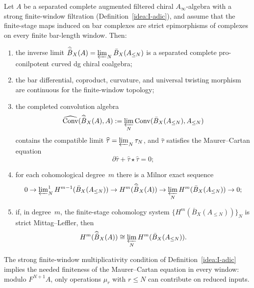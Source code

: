 \begin{theorem}\label{thm:completion-convergence}
Let $A$ be a separated complete augmented filtered chiral
$A_\infty$-algebra with a strong finite-window filtration
\textup{(}Definition~\textup{\ref{idea:I-adic}}\textup{)}, and assume
that the finite-stage maps induced on bar complexes are strict
epimorphisms of complexes on every finite bar-length window.  Then:
\begin{enumerate}
\item the inverse limit
 $\widehat{\bar B}_X(A)=\varprojlim_N\bar B_X(A_{\le N})$
 is a separated complete pro-conilpotent curved dg chiral coalgebra;
\item the bar differential, coproduct, curvature, and universal
 twisting morphism are continuous for the finite-window topology;
\item the completed convolution algebra
 \[
 \widehat{\operatorname{Conv}}(\widehat{\bar B}_X(A),A)
 :=
 \varprojlim_N
 \operatorname{Conv}(\bar B_X(A_{\le N}),A_{\le N})
 \]
 contains the compatible limit
 $\widehat\tau=\varprojlim_N\tau_N$, and
 $\widehat\tau$ satisfies the Maurer--Cartan equation
 \[
 \partial\widehat\tau+\widehat\tau\star\widehat\tau=0;
 \]
\item for each cohomological degree~$m$ there is a Milnor exact
 sequence
 \[
 0\to
 \varprojlim\nolimits_N^1 H^{m-1}(\bar B_X(A_{\le N}))
 \to
 H^m(\widehat{\bar B}_X(A))
 \to
 \varprojlim_N H^m(\bar B_X(A_{\le N}))
 \to0;
 \]
\item if, in degree~$m$, the finite-stage cohomology system
 $\{H^m(\bar B_X(A_{\le N}))\}_N$ is strict Mittag--Leffler, then
 \[
 H^m(\widehat{\bar B}_X(A))
 \cong
 \varprojlim_N H^m(\bar B_X(A_{\le N})).
 \]
\end{enumerate}
The strong finite-window multiplicativity condition of
Definition~\ref{idea:I-adic} implies the needed finiteness of the
Maurer--Cartan equation in every window: modulo $F^{N+1}A$, only
operations $\mu_r$ with $r\le N$ can contribute on reduced inputs.
\end{theorem}

